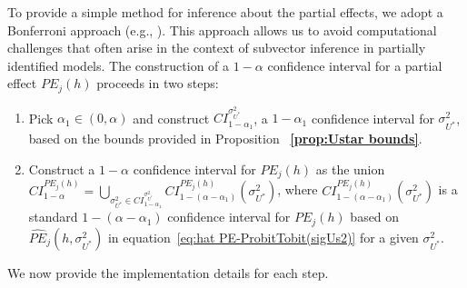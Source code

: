\documentclass[11pt]{article}
\begin{document}
To provide a simple method for inference about the partial effects, we adopt
a Bonferroni approach (e.g., \citealp{McCloskey2017JoE}). This approach
allows us to avoid computational challenges that often arise in the context
of subvector inference in partially identified models. The construction of a 
$1-\alpha $ confidence interval for a partial effect $PE_{j}(h)$ proceeds in
two steps:

\begin{enumerate}
\item Pick $\alpha _{1}\in (0,\alpha )$ and construct $CI_{1-\alpha
_{1}}^{\sigma _{U^{\ast }}^{2}}$, a $1-\alpha _{1}$ confidence interval for $%
\sigma _{U^{\ast }}^{2}$, based on the bounds provided in Proposition~%
\textbf{\ref{prop:Ustar bounds}}.

\item Construct a $1-\alpha $ confidence interval for $PE_{j}(h)$ as the
union $CI_{1-\alpha }^{PE_{j}(h)}=\bigcup_{\sigma _{U^{\ast }}^{2}\in
CI_{1-\alpha _{1}}^{\sigma _{U^{\ast }}^{2}}}CI_{1-\left( \alpha -\alpha
_{1}\right) }^{PE_{j}(h)}\left( \sigma _{U^{\ast }}^{2}\right) $, where $%
CI_{1-\left( \alpha -\alpha _{1}\right) }^{PE_{j}(h)}\left( \sigma _{U^{\ast
}}^{2}\right) $ is a standard $1-(\alpha -\alpha _{1})$ confidence interval
for $PE_{j}(h)$ based on $\widehat{PE}_{{j}}\left( h,\sigma _{U^{\ast
}}^{2}\right) $ in equation~\eqref{eq:hat PE-ProbitTobit(sigUs2)} for a
given $\sigma _{U^{\ast }}^{2}$.
\end{enumerate}

We now provide the implementation details for each step.

\smallskip
\end{document}
